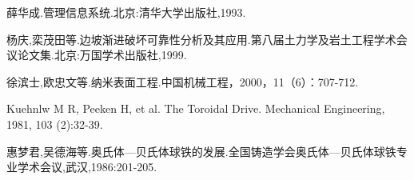 

\begin{thebibliography}{99}\addtolength{\itemsep}{-1.5ex}

 薛华成.管理信息系统.北京:清华大学出版社,1993.

 杨庆,栾茂田等.边坡渐进破坏可靠性分析及其应用.第八届土力学及岩土工程学术会议论文集.北京:万国学术出版社,1999.

 徐滨士,欧忠文等.纳米表面工程.中国机械工程，2000，11（6）：707-712.

 Kuehnlw M R, Peeken H, et al. The Toroidal Drive. Mechanical Engineering, 1981, 103 (2):32-39.

 惠梦君,吴德海等.奥氏体—贝氏体球铁的发展.全国铸造学会奥氏体—贝氏体球铁专业学术会议,武汉,1986:201-205.

\end{thebibliography}